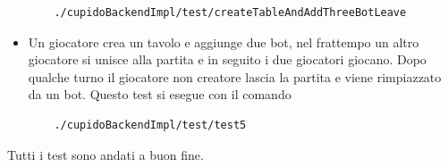 \begin{itemize}
      \begin{verbatim}
	./cupidoBackendImpl/test/createTableAndAddThreeBotLeave
      \end{verbatim}
    \item
      Un giocatore crea un tavolo e aggiunge due bot, nel frattempo un altro giocatore si unisce alla partita e in seguito i due giocatori giocano. Dopo qualche turno il giocatore non creatore lascia la partita e viene rimpiazzato da un bot. Questo test si esegue con il comando
      \begin{verbatim}
	./cupidoBackendImpl/test/test5
      \end{verbatim}
  \end{itemize}
  Tutti i test sono andati a buon fine.
